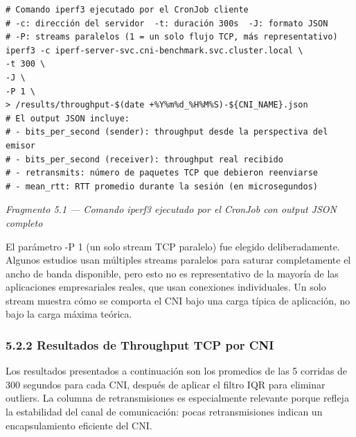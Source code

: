 \documentclass[journal]{IEEEtran}
\begin{document}
\begin{lstlisting}[basicstyle=\ttfamily\scriptsize,breaklines=true]
# Comando iperf3 ejecutado por el CronJob cliente
# -c: dirección del servidor  -t: duración 300s  -J: formato JSON
# -P: streams paralelos (1 = un solo flujo TCP, más representativo)
iperf3 -c iperf-server-svc.cni-benchmark.svc.cluster.local \
-t 300 \
-J \
-P 1 \
> /results/throughput-$(date +%Y%m%d_%H%M%S)-${CNI_NAME}.json
# El output JSON incluye:
# - bits_per_second (sender): throughput desde la perspectiva del emisor
# - bits_per_second (receiver): throughput real recibido
# - retransmits: número de paquetes TCP que debieron reenviarse
# - mean_rtt: RTT promedio durante la sesión (en microsegundos)
\end{lstlisting}

\begin{center}\emph{\emph{Fragmento 5.1 --- Comando iperf3 ejecutado por el CronJob con output JSON completo}}\end{center}

El parámetro -P 1 (un solo stream TCP paralelo) fue elegido deliberadamente. Algunos estudios usan múltiples streams paralelos para saturar completamente el ancho de banda disponible, pero esto no es representativo de la mayoría de las aplicaciones empresariales reales, que usan conexiones individuales. Un solo stream muestra cómo se comporta el CNI bajo una carga típica de aplicación, no bajo la carga máxima teórica.

\subsubsection{5.2.2 Resultados de Throughput TCP por CNI}

Los resultados presentados a continuación son los promedios de las 5 corridas de 300 segundos para cada CNI, después de aplicar el filtro IQR para eliminar outliers. La columna de retransmisiones es especialmente relevante porque refleja la estabilidad del canal de comunicación: pocas retransmisiones indican un encapsulamiento eficiente del CNI.
\end{document}
